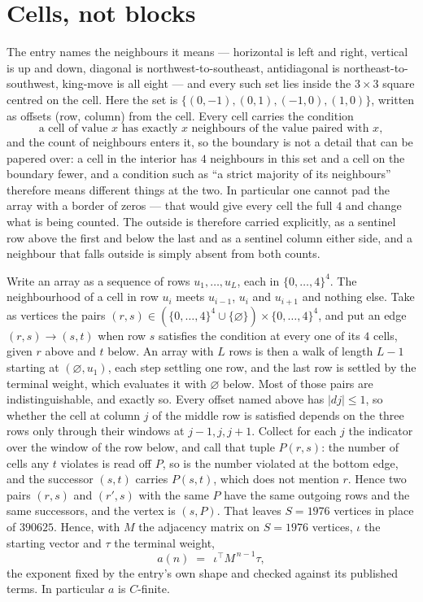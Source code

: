 \documentclass[11pt,a4paper]{article}
\theoremstyle{plain}
\theoremstyle{definition}
\begin{document}
\section{Cells, not blocks}

The entry names the neighbours it means --- horizontal is left and right, vertical is up and
down, diagonal is northwest-to-southeast, antidiagonal is northeast-to-southwest, king-move is
all eight --- and every such set lies inside the $3\times3$ square centred on the cell. Here
the set is $\{(0,-1), (0,1), (-1,0), (1,0)\}$, written as offsets (row, column) from the cell. Every cell carries
the condition
\[
\text{a cell of value }x\text{ has exactly }x\text{ neighbours of the value paired with }x,
\]
and the count of neighbours enters it, so the boundary is not a detail that can be papered
over: a cell in the interior has $4$ neighbours in this set and a cell on the boundary
fewer, and a condition such as ``a strict majority of its neighbours'' therefore means
different things at the two. In particular one cannot pad the array with a border of zeros ---
that would give every cell the full $4$ and change what is being counted. The outside is
therefore carried
explicitly, as a sentinel row above the first and below the last and as a sentinel column
either side, and a neighbour that falls outside is simply absent from both counts.

Write an array as a sequence of rows $u_1,\dots,u_L$, each in
$\{0,\dots,4\}^{4}$. The neighbourhood of a cell in row $u_i$ meets $u_{i-1}$,
$u_i$ and $u_{i+1}$ and nothing else. Take as vertices the pairs
$(r,s)\in(\{0,\dots,4\}^{4}\cup\{\varnothing\})\times\{0,\dots,4\}^{4}$,
and put an edge $(r,s)\to(s,t)$ when row $s$ satisfies the condition at every one of its
$4$ cells, given $r$ above and $t$ below. An array with $L$ rows is then a walk of length
$L-1$ starting at $(\varnothing,u_1)$, each step settling one row, and the last row is
settled by the terminal weight, which evaluates it with $\varnothing$ below. Most of those pairs are indistinguishable, and exactly so. Every offset named above has $|dj|\le 1$, so whether the cell at column $j$ of the middle row is satisfied depends on the three rows only through their windows at $j-1,j,j+1$. Collect for each $j$ the indicator over the window of the row below, and call that tuple $P(r,s)$: the number of cells any $t$ violates is read off $P$, so is the number violated at the bottom edge, and the successor $(s,t)$ carries $P(s,t)$, which does not mention $r$. Hence two pairs $(r,s)$ and $(r',s)$ with the same $P$ have the same outgoing rows and the same successors, and the vertex is $(s,P)$. That leaves $S=1976$ vertices in place of $390625$. Hence,
with $M$ the adjacency matrix on $S=1976$ vertices, $\iota$ the starting vector and $\tau$ the
terminal weight,
\[
a(n)\;=\;\,\iota^{\!\top}M^{\,n-1}\tau ,
\]
the exponent fixed by the entry's own shape and checked against its published terms. In
particular $a$ is $C$-finite.
\end{document}
